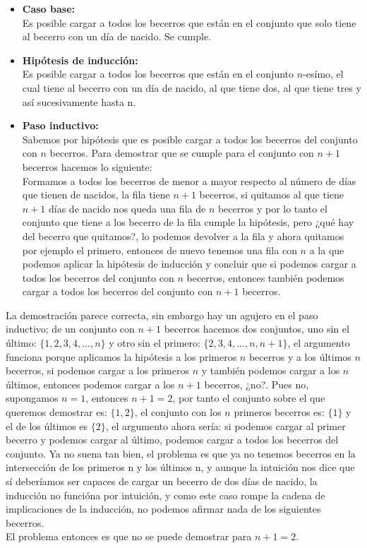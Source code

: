 \documentclass[spanish,12pt,letterpaper]{article}
\begin{document}
\begin{itemize}
\item \textbf{Caso base:}\\
Es posible cargar a todos los becerros que están en el conjunto que solo tiene
al becerro con un día de nacido. Se cumple.

\item \textbf{Hipótesis de inducción:}\\
Es posible cargar a todos los becerros que están en el conjunto $n$-esímo, el
cual tiene al becerro con un día de nacido, al que tiene dos, al que tiene tres
y así sucesivamente hasta n.

\item \textbf{Paso inductivo:}\\
Sabemos por hipótesis que es posible cargar a todos los becerros del conjunto
con $n$ becerros. Para demostrar que se cumple para el conjunto con $n+1$
becerros hacemos lo siguiente:\\
Formamos a todos los becerros de menor a mayor respecto al número de días que
tienen de nacidos, la fila tiene $n+1$ becerros, si quitamos al que tiene
$n+1$ días de nacido nos queda una fila de $n$ becerros y por lo tanto el conjunto que tiene a los becerro de la fila cumple
la hipótesis, pero ¿qué hay del becerro que quitamos?, lo podemos devolver a la
fila y ahora quitamos por ejemplo el primero, entonces de nuevo
tenemos una fila con $n$ a la que podemos aplicar la hipótesis de inducción y
concluir que si podemos cargar a todos los becerros del conjunto con $n$
becerros, entonces también podemos cargar a todos los becerros del conjunto con
$n+1$ becerros.
\end{itemize}

\noindent La demostración parece correcta, sin embargo hay un agujero en el paso
inductivo; de un conjunto con $n+1$ becerros hacemos dos conjuntos, uno sin el
último: $\{1,2,3,4,\dots,n\}$ y otro sin el primero: $\{2,3,4,\dots,n,n+1 \}$,
el argumento funciona porque aplicamos la hipótesis a los primeros $n$ becerros
y a los últimos $n$ becerros, si podemos cargar a los primeros $n$ y también
podemos cargar a los $n$ últimos, entonces podemos cargar a los $n+1$ becerros,
¿no?. Pues no, supongamos $n=1$, entonces $n+1=2$, por tanto el conjunto sobre
el que queremos demostrar es: $\{1,2\}$, el conjunto con los $n$ primeros
becerros es: $\{1\}$ y el de los últimos es $\{2\}$, el argumento ahora sería:
si podemos cargar al primer becerro y podemos cargar al último, podemos cargar
a todos los becerros del conjunto. Ya no suena tan bien, el problema es que ya
no tenemos becerros en la intersección de los primeros n y los últimos n, y
aunque la intuición nos dice que sí deberíamos ser capaces de cargar un becerro
de dos días de nacido, la inducción no funcióna por intuición, y como este caso rompe la cadena de implicaciones de la
inducción, no podemos afirmar nada de los siguientes becerros.\\
El problema entonces es que no se puede demostrar para $n+1=2$.
\end{document}
